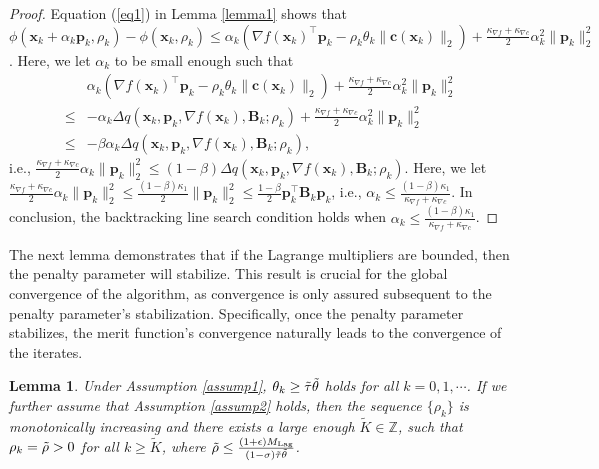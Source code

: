 \documentclass[aos]{imsart}
\numberwithin{equation}{section}
\theoremstyle{plain}
\newtheorem{lemma}{Lemma}
\begin{document}
\begin{appendix}
 \begin{proof}
     Equation (\ref{eq1}) in Lemma \ref{lemma1} shows that $\phi(\bm{x}_k+\alpha_k \bm{p}_k,\rho_k) - \phi(\bm{x}_k,\rho_k) \leq \alpha_k \left(\nabla f(\bm{x}_k)^{\top} \bm{p}_k - \rho_k \theta_k \|\bm{c}(\bm{x}_k)\|_2 \right) + \frac{\kappa_{\nabla f}+\kappa_{\nabla c}}{2} \alpha_k^2 \|\bm{p}_k\|_2^2$. Here, we let $\alpha_k$ to be small enough such that  
     \begin{equation*}
         \begin{split}
             &\alpha_k \left(\nabla f(\bm{x}_k)^{\top} \bm{p}_k - \rho_k \theta_k \|\bm{c}(\bm{x}_k)\|_2 \right) + \frac{\kappa_{\nabla f}+\kappa_{\nabla c}}{2} \alpha_k^2 \|\bm{p}_k\|_2^2\\
             \leq &  -\alpha_k \Delta q(\bm{x}_k,\bm{p}_k,\nabla f(\bm{x}_k),\bm{B}_k;\rho_k) + \frac{\kappa_{\nabla f}+\kappa_{\nabla c}}{2} \alpha_k^2 \|\bm{p}_k\|_2^2\\
             \leq & -\beta \alpha_k \Delta q(\bm{x}_k,\bm{p}_k,\nabla f(\bm{x}_k),\bm{B}_k;\rho_k),
         \end{split}
     \end{equation*}
     i.e., $\frac{\kappa_{\nabla f}+\kappa_{\nabla c}}{2} \alpha_k \|\bm{p}_k\|_2^2 \leq (1-\beta)\Delta q(\bm{x}_k,\bm{p}_k,\nabla f(\bm{x}_k),\bm{B}_k;\rho_k)$. Here, we let $\frac{\kappa_{\nabla f}+\kappa_{\nabla c}}{2} \alpha_k \|\bm{p}_k\|_2^2 \leq \frac{(1-\beta) \kappa_1}{2} \|\bm{p}_k\|_2^2 \leq \frac{1-\beta}{2}\bm{p}_k^{\top} \bm{B}_k \bm{p}_k$, i.e., $\alpha_k \leq \frac{(1-\beta)\kappa_1}{\kappa_{\nabla f}+\kappa_{\nabla c}}$. In conclusion, the backtracking line search condition holds when  $\alpha_k \leq \frac{(1-\beta)\kappa_1}{\kappa_{\nabla f}+\kappa_{\nabla c}}$.
 \end{proof}


The next lemma demonstrates that if the Lagrange multipliers are bounded, then the penalty parameter will stabilize. This result is crucial for the global convergence of the algorithm, as convergence is only assured subsequent to the penalty parameter's stabilization. Specifically, once the penalty parameter stabilizes, the merit function's convergence naturally leads to the convergence of the iterates.
\begin{lemma}
  \label{lemma3}
     Under Assumption \ref{assump1}, $\theta_k \geq \Tilde{\tau} \Tilde{\theta}$ holds for all $k=0,1, \cdots$. If we further assume that Assumption \ref{assump2} holds, then the sequence $\{\rho_k\}$ is monotonically increasing and there exists a large enough $\widetilde{K} \in \mathbb{Z}$, such that $\rho_k = \Tilde{\rho} > 0$ for all $k 
     \geq \widetilde{K}$, where $\Tilde{\rho} \leq \frac{(1+\epsilon)M_{\text{Lag}}}{(1-\sigma)\Tilde{\tau} \Tilde{\theta}}$.   
 \end{lemma}


\end{appendix}
\end{document}

